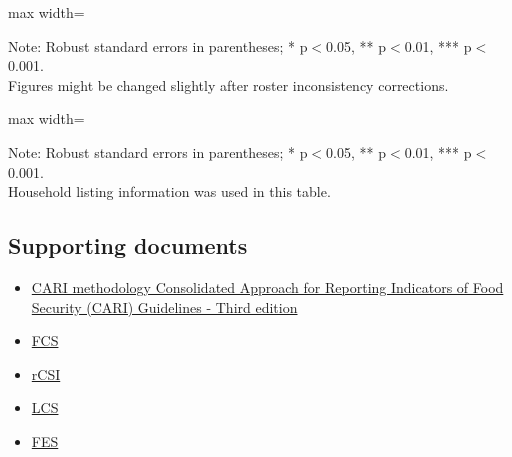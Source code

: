 \documentclass[11pt,harvard]{article}
\begin{document}
	
\begin{table}[htbp]
		\centering
		\begin{adjustbox}{max width=\textwidth}
			\begin{threeparttable}
				\caption{Ecuador Sample Balance Table}
				\scriptsize
				 
				\label{tab:Ecuador_Modality_Demo_Balance}
				\begin{tablenotes}
					\item Note: Robust standard errors in parentheses; * p$<$0.05, ** p$<$0.01, *** p$<$0.001. \\
					Figures might be changed slightly after roster inconsistency corrections.
				\end{tablenotes}
			\end{threeparttable}
		\end{adjustbox}
\end{table}
	
\begin{table}[htbp]
		\centering
		\begin{adjustbox}{max width=\textwidth}
			\begin{threeparttable}
				\caption{CAR Sample Balance Table}
				\scriptsize
				 
				\label{tab:CAR_Modality_Own_Phone_Demo_Balance}
				\begin{tablenotes}
					\item Note: Robust standard errors in parentheses; * p$<$0.05, ** p$<$0.01, *** p$<$0.001. \\
					Household listing information was used in this table.
				\end{tablenotes}
			\end{threeparttable}
		\end{adjustbox}
\end{table}
	
	
\subsection{Supporting documents}
	
\begin{itemize}
		\item \href{https://resources.vam.wfp.org/data-analysis/quantitative/food-security/cari}{CARI methodology Consolidated Approach for Reporting Indicators of Food Security (CARI) Guidelines - Third edition}
		\item \href{https://resources.vam.wfp.org/data-analysis/quantitative/food-security/food-consumption-score}{FCS}
		\item \href{https://resources.vam.wfp.org/data-analysis/quantitative/food-security/reduced-coping-strategies-index}{rCSI}
		\item \href{https://resources.vam.wfp.org/data-analysis/quantitative/food-security/livelihood-coping-strategies-food-security}{LCS}
		\item \href{https://resources.vam.wfp.org/data-analysis/quantitative/food-security/food-expenditure-share}{FES}
\end{itemize} 
	
	
\end{document}
